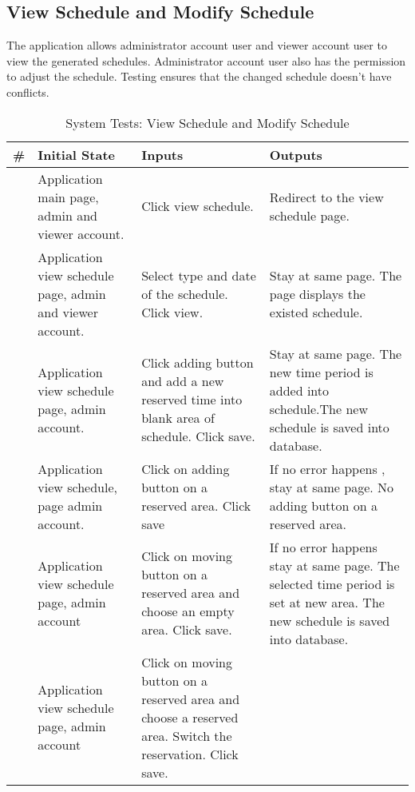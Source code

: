 \documentclass[12pt]{article}
\newcounter{TestCounter}
\begin{document}
\subsection{View Schedule and Modify Schedule}
The application allows administrator account user and viewer account user to view the generated schedules. Administrator account user also has the permission to adjust the schedule. Testing ensures that the changed schedule doesn’t have conflicts. 
\begin{center}
	\begin{longtable}{c>{\raggedright\arraybackslash}p{4.8cm} >{\raggedright\arraybackslash}p{3cm}>{\raggedright\arraybackslash}p{3cm}}
		\caption{System Tests: View Schedule and Modify Schedule}\label{ViewSchedule_SystemTests}\\
		\toprule
		\bf \# & \bf Initial State & \bf Inputs & \bf Outputs \\\midrule
		\stepcounter{TestCounter}\arabic{TestCounter} 
		& Application main page, admin and viewer account.
		& Click view schedule. 
		& Redirect to the view schedule page.
		\\\midrule
		\stepcounter{TestCounter}\arabic{TestCounter} 
		& Application view schedule page, admin and viewer account.
		& Select type and date of the schedule. Click view.
		& Stay at same page. The page displays the existed schedule.
		\\\midrule
		\stepcounter{TestCounter}\arabic{TestCounter} 
		& Application view schedule page, admin account.
		& Click adding button and add a new reserved time into blank area of schedule. Click save.
		& Stay at same page. The new time period is added into schedule.The new schedule is saved into database.
		\\\midrule
		\stepcounter{TestCounter}\arabic{TestCounter} 
		& Application view schedule, page admin account.
		& Click on adding button on a reserved area. Click save 
		& If no error happens , stay at same page. No adding button on a reserved area.
		\\\midrule
		\stepcounter{TestCounter}\arabic{TestCounter} 
		& Application view schedule page, admin account 
		& Click on moving button on a reserved area and choose an empty area. Click save.
		& If no error happens stay at same page. The selected time period is set at new area. The new schedule is saved into database.
		\\\midrule
		\stepcounter{TestCounter}\arabic{TestCounter} 
		& Application view schedule page, admin account 
		& Click on moving button on a reserved area and choose a reserved area. Switch the reservation. Click save.

\end{longtable}
\end{center}
\end{document}
